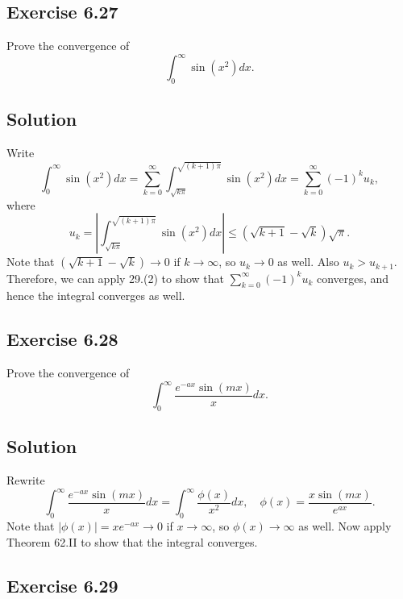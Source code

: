 \subsection*{Exercise 6.27}

Prove the convergence of
\begin{equation*}
    \int_0^{\infty} \sin(x^2) dx.
\end{equation*}

\subsection*{Solution}

Write
\begin{equation*}
    \int_0^{\infty} \sin(x^2) dx
        = \sum_{k = 0}^{\infty} \int_{\sqrt{k \pi}}^{\sqrt{(k + 1) \pi}} \sin(x^2) dx
        = \sum_{k = 0}^{\infty} (-1)^k u_k,
\end{equation*}
where
\begin{equation*}
    u_k = \left| \int_{\sqrt{k \pi}}^{\sqrt{(k + 1)\pi}} \sin(x^2) dx \right| \leq (\sqrt{k+1} - \sqrt{k}) \sqrt{\pi}.
\end{equation*}
Note that $(\sqrt{k+1} - \sqrt{k}) \to 0$ if $k \to \infty$, so $u_k \to 0$ as well.
Also $u_k > u_{k+1}$.
Therefore, we can apply 29.(2) to show that $\sum_{k = 0}^{\infty} (-1)^k u_k$ converges, and hence the integral converges as well.


\subsection*{Exercise 6.28}

Prove the convergence of
\begin{equation*}
    \int_0^{\infty} \frac{e^{-ax} \sin(mx)}{x} dx.
\end{equation*}

\subsection*{Solution}
Rewrite
\begin{equation*}
    \int_0^{\infty} \frac{e^{-ax} \sin(mx)}{x} dx
        = \int_0^{\infty} \frac{\phi(x)}{x^2} dx, \quad \phi(x) = \frac{x \sin(mx)}{e^{ax}}.
\end{equation*}
Note that $|\phi(x)| = xe^{-ax} \to 0$ if $x \to \infty$, so $\phi(x) \to \infty$ as well.
Now apply Theorem 62.II to show that the integral converges.


\subsection*{Exercise 6.29}

